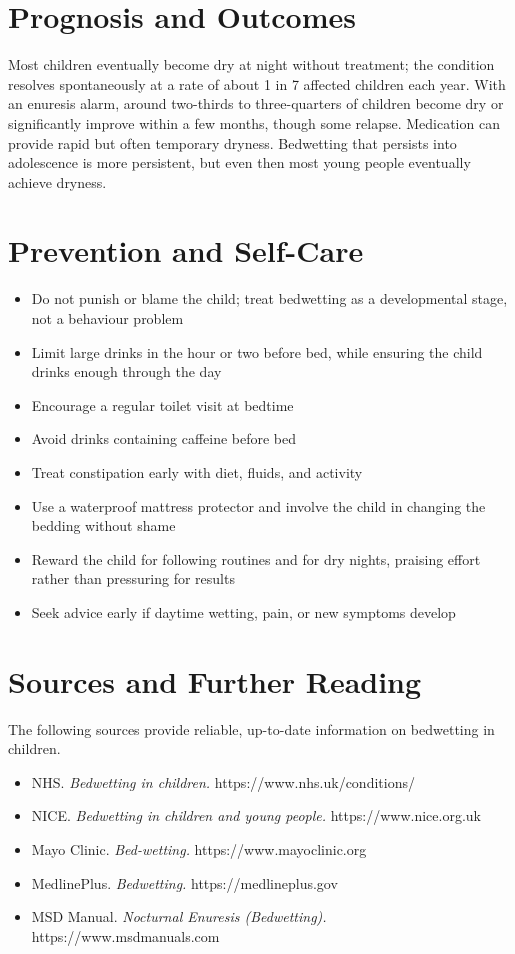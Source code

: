 \section*{Prognosis and Outcomes}
Most children eventually become dry at night without treatment; the condition resolves spontaneously at a rate of about 1 in 7 affected children each year. With an enuresis alarm, around two-thirds to three-quarters of children become dry or significantly improve within a few months, though some relapse. Medication can provide rapid but often temporary dryness. Bedwetting that persists into adolescence is more persistent, but even then most young people eventually achieve dryness.

\section*{Prevention and Self-Care}
\begin{itemize}
    \item Do not punish or blame the child; treat bedwetting as a developmental stage, not a behaviour problem
    \item Limit large drinks in the hour or two before bed, while ensuring the child drinks enough through the day
    \item Encourage a regular toilet visit at bedtime
    \item Avoid drinks containing caffeine before bed
    \item Treat constipation early with diet, fluids, and activity
    \item Use a waterproof mattress protector and involve the child in changing the bedding without shame
    \item Reward the child for following routines and for dry nights, praising effort rather than pressuring for results
    \item Seek advice early if daytime wetting, pain, or new symptoms develop
\end{itemize}

\section*{Sources and Further Reading}
The following sources provide reliable, up-to-date information on bedwetting in children.
\begin{itemize}
    \item NHS. \textit{Bedwetting in children.} https://www.nhs.uk/conditions/
    \item NICE. \textit{Bedwetting in children and young people.} https://www.nice.org.uk
    \item Mayo Clinic. \textit{Bed-wetting.} https://www.mayoclinic.org
    \item MedlinePlus. \textit{Bedwetting.} https://medlineplus.gov
    \item MSD Manual. \textit{Nocturnal Enuresis (Bedwetting).} https://www.msdmanuals.com
\end{itemize}
